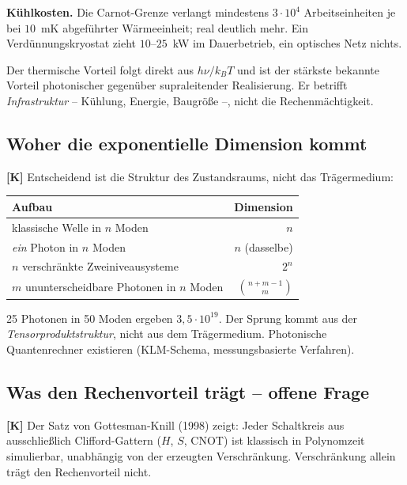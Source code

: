 \textbf{Kühlkosten.} Die Carnot-Grenze verlangt mindestens
$3\cdot10^{4}$ Arbeitseinheiten je bei $10$~mK abgeführter
Wärmeeinheit; real deutlich mehr. Ein Verdünnungskryostat zieht
$10$--$25$~kW im Dauerbetrieb, ein optisches Netz nichts.

\begin{keyresult}
Der thermische Vorteil folgt direkt aus $h\nu/k_BT$ und ist der
stärkste bekannte Vorteil photonischer gegenüber supraleitender
Realisierung. Er betrifft \emph{Infrastruktur} -- Kühlung, Energie,
Baugröße --, nicht die Rechenmächtigkeit.
\end{keyresult}

\subsection{Woher die exponentielle Dimension kommt}

\textbf{[K]} Entscheidend ist die Struktur des Zustandsraums, nicht das
Trägermedium:

\begin{center}
\begin{tabular}{lr}
\toprule
Aufbau & Dimension \\
\midrule
klassische Welle in $n$ Moden & $n$ \\
\emph{ein} Photon in $n$ Moden & $n$ \quad(dasselbe) \\
$n$ verschränkte Zweiniveausysteme & $2^n$ \\
$m$ ununterscheidbare Photonen in $n$ Moden & $\binom{n+m-1}{m}$ \\
\bottomrule
\end{tabular}
\end{center}

25 Photonen in 50 Moden ergeben $3{,}5\cdot10^{19}$. Der Sprung kommt
aus der \emph{Tensorproduktstruktur}, nicht aus dem Trägermedium.
Photonische Quantenrechner existieren (KLM-Schema, messungsbasierte
Verfahren).

\subsection{Was den Rechenvorteil trägt -- offene Frage}

\textbf{[K]} Der Satz von Gottesman-Knill (1998) zeigt: Jeder
Schaltkreis aus ausschließlich Clifford-Gattern ($H$, $S$, CNOT) ist
klassisch in Polynomzeit simulierbar, unabhängig von der erzeugten
Verschränkung. Verschränkung allein trägt den Rechenvorteil nicht.

